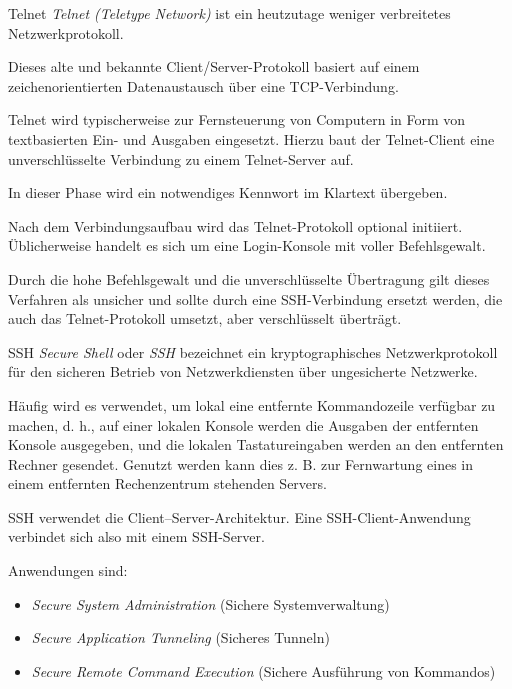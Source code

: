 \begin{bonus}{Telnet}
    \emph{Telnet (Teletype Network)} ist ein heutzutage weniger verbreitetes Netzwerkprotokoll.

    Dieses alte und bekannte Client/Server-Protokoll basiert auf einem zeichenorientierten Datenaustausch über eine TCP-Verbindung.

    Telnet wird typischerweise zur Fernsteuerung von Computern in Form von textbasierten Ein- und Ausgaben eingesetzt.
    Hierzu baut der Telnet-Client eine unverschlüsselte Verbindung zu einem Telnet-Server auf.

    In dieser Phase wird ein notwendiges Kennwort im Klartext übergeben.

    Nach dem Verbindungsaufbau wird das Telnet-Protokoll optional initiiert.
    Üblicherweise handelt es sich um eine Login-Konsole mit voller Befehlsgewalt.

    Durch die hohe Befehlsgewalt und die unverschlüsselte Übertragung gilt dieses Verfahren als unsicher und sollte durch eine SSH-Verbindung ersetzt werden, die auch das Telnet-Protokoll umsetzt, aber verschlüsselt überträgt.
\end{bonus}

\begin{defi}{SSH}
    \emph{Secure Shell} oder \emph{SSH} bezeichnet ein kryptographisches Netzwerkprotokoll für den sicheren Betrieb von Netzwerkdiensten über ungesicherte Netzwerke.

    Häufig wird es verwendet, um lokal eine entfernte Kommandozeile verfügbar zu machen, d. h., auf einer lokalen Konsole werden die Ausgaben der entfernten Konsole ausgegeben, und die lokalen Tastatureingaben werden an den entfernten Rechner gesendet.
    Genutzt werden kann dies z. B. zur Fernwartung eines in einem entfernten Rechenzentrum stehenden Servers.

    SSH verwendet die Client–Server-Architektur. Eine SSH-Client-Anwendung verbindet sich also mit einem SSH-Server.

    Anwendungen sind:
    \begin{itemize}
        \item \emph{Secure System Administration} (Sichere Systemverwaltung)
        \item \emph{Secure Application Tunneling} (Sicheres Tunneln)
        \item \emph{Secure Remote Command Execution} (Sichere Ausführung von Kommandos)
    \end{itemize}
\end{defi}

